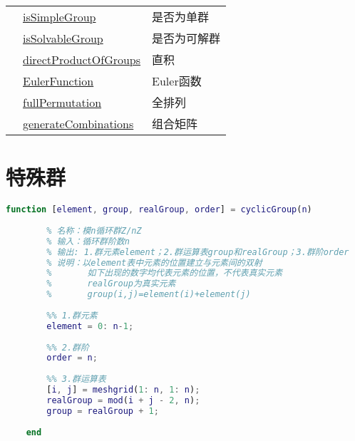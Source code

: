 \begin{table}[htbp]
\begin{tabular}{|>{\centering\arraybackslash}m{1.5cm}|>{\centering\arraybackslash}m{5cm}|>{\centering\arraybackslash}m{4cm}|}
		& \hyperref[isSimpleGroup]{isSimpleGroup} & 是否为单群 \\
		& \hyperref[isSolvableGroup]{isSolvableGroup} & 是否为可解群 \\
		& \hyperref[directProductOfGroups]{directProductOfGroups} & 直积 \\
		\hline
		\multirow{3}{*}{辅助函数} 
		& \hyperref[EulerFunction]{EulerFunction} & Euler函数 \\
		& \hyperref[fullPermutation]{fullPermutation} & 全排列 \\
		& \hyperref[generateCombinations]{generateCombinations} & 组合矩阵 \\
		\hline
	\end{tabular}
\end{table}

\section{特殊群}

\begin{lstlisting}[language=Matlab, caption={循环群}, label={cyclicGroup}]
	function [element, group, realGroup, order] = cyclicGroup(n)
	
	    % 名称：模n循环群Z/nZ
	    % 输入：循环群阶数n
	    % 输出: 1.群元素element；2.群运算表group和realGroup；3.群阶order
	    % 说明：以element表中元素的位置建立与元素间的双射
	    %       如下出现的数字均代表元素的位置，不代表真实元素
	    %       realGroup为真实元素
	    %       group(i,j)=element(i)+element(j)
	
	    %% 1.群元素
	    element = 0: n-1;
	
	    %% 2.群阶
	    order = n;
	
	    %% 3.群运算表
	    [i, j] = meshgrid(1: n, 1: n);
	    realGroup = mod(i + j - 2, n);
	    group = realGroup + 1;
	
	end
	
\end{lstlisting}

